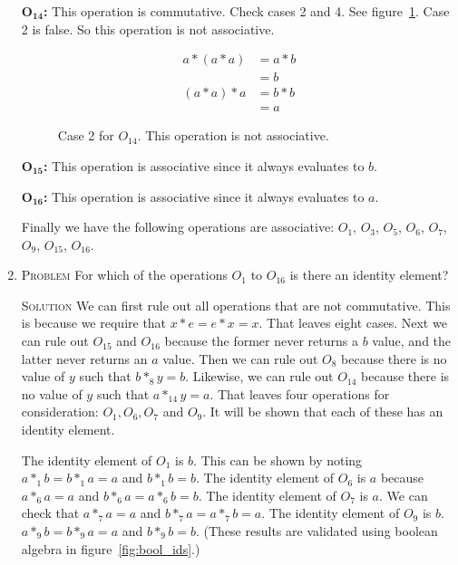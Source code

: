 \documentclass[draft,twoside]{amsart}
\newcommand{\Solution}{\textsc{Solution}\xspace}
\newcommand{\Problem}{\textsc{Problem}\xspace}
\begin{document}
\begin{enumerate}
   $\mathbf{O_{14}}$\textbf{:} This operation is commutative. Check cases
   2 and 4. See figure~\ref{fig:o14_assoc}. Case 2 is false. So this
   operation is not associative.

   \begin{figure}
      \caption{Case 2 for $O_{14}$. This operation is not associative.}
      \label{fig:o14_assoc}
      \begin{align*}
         a * (a * a) & = a * b \\
	             & = b \\
         (a * a) * a & = b * b \\
	             & = a
      \end{align*}
   \end{figure}

   $\mathbf{O_{15}}$\textbf{:} This operation is associative since it
   always evaluates to $b$.

   $\mathbf{O_{16}}$\textbf{:} This operation is associative since
   it always evaluates to $a$.

   Finally we have the following operations are associative: $O_1$, 
   $O_3$, $O_5$, $O_6$, $O_7$, $O_9$, $O_15$, $O_16$.

   \item \Problem For which of the operations $O_1$ to $O_{16}$ is there an 
   identity element?

   \noindent \Solution We can first rule out all operations that are not
   commutative. This is because we require that $x*e=e*x=x$. That leaves
   eight cases. Next we can rule out $O_{15}$ and $O_{16}$ because the
   former never returns a $b$ value, and the latter never returns an $a$
   value. Then we can rule out $O_8$ because there is no value of $y$ such
   that $b *_8 y = b$. Likewise, we can rule out $O_{14}$ because there
   is no value of $y$ such that $a *_{14} y = a$. That leaves four operations
   for consideration: $O_1, O_6, O_7$ and $O_9$. It will be shown
   that each of these has an identity element.

   The identity element of $O_1$ is $b$. This can be shown by noting
   $a *_{1} b = b *_{1} a = a$ and $b *_1 b = b$. The identity element
   of $O_6$ is $a$ because $a *_6 a = a$ and $b *_6 a = a *_6 b = b$.
   The identity element of $O_7$ is $a$. We can check that $a *_7 a = a$ and
   $b *_7 a = a *_7 b = a$. The identity element of $O_9$ is $b$.
   $a *_9 b = b *_9 a = a$ and $b *_9 b = b$. (These results are
   validated using boolean algebra in figure~\ref{fig:bool_ids}.)


\end{enumerate}
\end{document}
